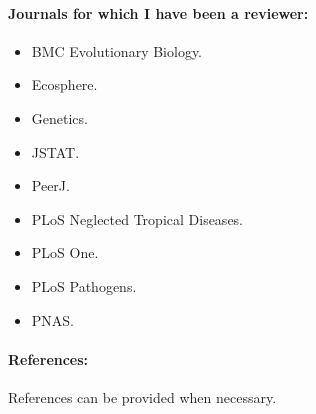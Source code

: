 \documentclass[a4paper]{article}
\begin{document}
\paragraph{Journals for which I have been a reviewer:}
\begin{itemize}
  \item[~] BMC Evolutionary Biology.
  \item[~] Ecosphere.
  \item[~] Genetics.
  \item[~] JSTAT.
  \item[~] PeerJ.
  \item[~] PLoS Neglected Tropical Diseases.
  \item[~] PLoS One.
  \item[~] PLoS Pathogens.
  \item[~] PNAS.
\end{itemize}


\paragraph{References:}
References can be provided when necessary.
\end{document}
